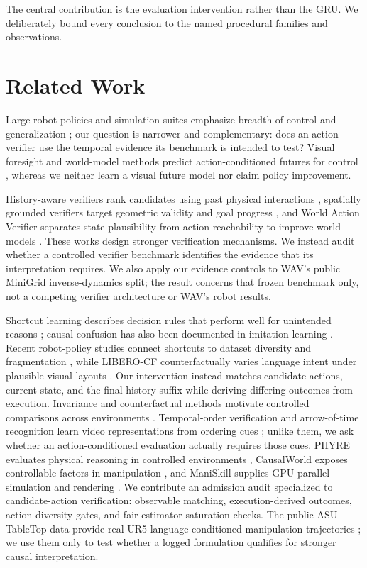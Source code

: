 \documentclass[letterpaper,10pt,conference]{ieeeconf}
\begin{document}
The central contribution is the evaluation intervention rather than the GRU.
We deliberately bound every conclusion to the named procedural families and
observations.

\section{Related Work}

Large robot policies and simulation suites emphasize breadth of control and
generalization \cite{brohan2022rt1,james2019rlbench,nasiriany2024robocasa};
our question is narrower and complementary: does an action verifier use the
temporal evidence its benchmark is intended to test? Visual foresight and
world-model methods predict action-conditioned futures for control
\cite{ebert2018visualforesight,hafner2023dreamerv3}, whereas we neither learn a
visual future model nor claim policy improvement.

History-aware verifiers rank candidates using past physical interactions
\cite{li2025have}, spatially grounded verifiers target geometric validity and
goal progress \cite{zhao2026verispace}, and World Action Verifier separates
state plausibility from action reachability to improve world models
\cite{liu2026wav}. These works design stronger verification mechanisms. We
instead audit whether a controlled verifier benchmark identifies the evidence
that its interpretation requires. We also apply our evidence controls to WAV's
public MiniGrid inverse-dynamics split; the result concerns that frozen
benchmark only, not a competing verifier architecture or WAV's robot results.

Shortcut learning describes decision rules that perform well for unintended
reasons \cite{geirhos2020shortcut,lapuschkin2019cleverhans}; causal confusion
has also been documented in imitation learning \cite{dehaan2019causal}.
Recent robot-policy studies connect shortcuts to dataset diversity and
fragmentation \cite{xing2025shortcut}, while LIBERO-CF counterfactually varies
language intent under plausible visual layouts \cite{fang2026liberocf}. Our
intervention instead matches candidate actions, current state, and the final
history suffix while deriving differing outcomes from execution.
Invariance and counterfactual methods motivate controlled comparisons across
environments \cite{arjovsky2019irm,wachter2017counterfactual}. Temporal-order
verification and arrow-of-time recognition learn video representations from
ordering cues \cite{misra2016shuffle,wei2018arrow}; unlike them, we ask whether
an action-conditioned evaluation actually requires those cues. PHYRE evaluates
physical reasoning in controlled environments \cite{bakhtin2019phyre},
CausalWorld exposes controllable factors in manipulation
\cite{ahmed2020causalworld}, and ManiSkill supplies GPU-parallel simulation and
rendering \cite{tao2024maniskill3}. We contribute an admission audit specialized
to candidate-action verification: observable matching, execution-derived
outcomes, action-diversity gates, and fair-estimator saturation checks.
The public ASU TableTop data provide real UR5 language-conditioned
manipulation trajectories \cite{zhou2023modularity}; we use them only to test
whether a logged formulation qualifies for stronger causal interpretation.
\end{document}
